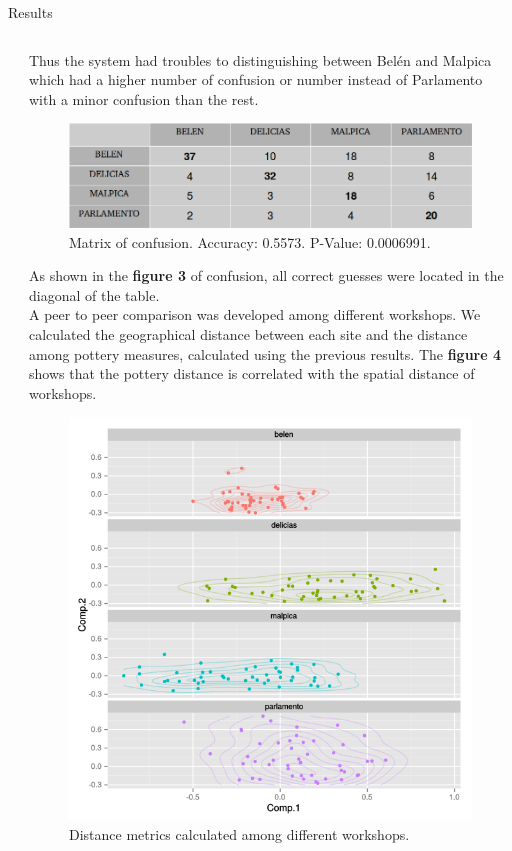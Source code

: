 \documentclass[final]{beamer}
\newlength{\twocolwid}
\begin{document}
\begin{frame}[t]
\begin{columns}[t]
\begin{column}{\twocolwid}
\begin{block}{Results}
\begin{columns}
\begin{column}{0.48\textwidth}
\end{column}

\begin{column}{0.48\textwidth}

\justify

 Thus the system had troubles to distinguishing between Bel\'en and Malpica which had a higher number of confusion or number instead of Parlamento with a minor confusion than the rest. 

 
\begin{figure}
\includegraphics[width=0.6\linewidth]{images/fig3.png}
\caption{Matrix of confusion. Accuracy: 0.5573. P-Value: 0.0006991.}
\end{figure}

\justify
As shown in the \textbf{figure 3} of confusion, all correct guesses were located in the diagonal of the table.\\
A peer to peer comparison was developed among different workshops. We calculated the geographical distance between each site and the distance among pottery measures, calculated using the previous results. The \textbf{figure 4}  shows that the pottery distance is correlated with the spatial distance of workshops.  

\begin{figure}
\includegraphics[width=0.7\linewidth]{images/fig2.png}
\caption{Distance metrics calculated among different workshops.}
\end{figure}


\end{column}
\end{columns}
\end{block}
\end{column}
\end{columns}
\end{frame}
\end{document}
